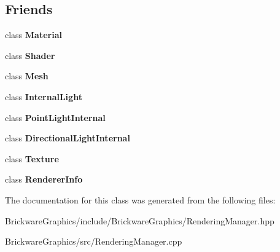 \subsection*{Friends}
\begin{DoxyCompactItemize}
\item 
\hypertarget{classBrickware_1_1Graphics_1_1RenderingManager_aa1212b6e372a0f45d2c01f3cd203af77}{}class {\bfseries Material}\label{classBrickware_1_1Graphics_1_1RenderingManager_aa1212b6e372a0f45d2c01f3cd203af77}

\item 
\hypertarget{classBrickware_1_1Graphics_1_1RenderingManager_a03c2d524ace9ade9c3f55b43c99bcea1}{}class {\bfseries Shader}\label{classBrickware_1_1Graphics_1_1RenderingManager_a03c2d524ace9ade9c3f55b43c99bcea1}

\item 
\hypertarget{classBrickware_1_1Graphics_1_1RenderingManager_aa41a130f156b145bffb3f4b5172c4c93}{}class {\bfseries Mesh}\label{classBrickware_1_1Graphics_1_1RenderingManager_aa41a130f156b145bffb3f4b5172c4c93}

\item 
\hypertarget{classBrickware_1_1Graphics_1_1RenderingManager_aea2864acc90890ef2bdd62187fac4a58}{}class {\bfseries Internal\+Light}\label{classBrickware_1_1Graphics_1_1RenderingManager_aea2864acc90890ef2bdd62187fac4a58}

\item 
\hypertarget{classBrickware_1_1Graphics_1_1RenderingManager_a63a6c2c4df25a9ee153e5cf241d1d24e}{}class {\bfseries Point\+Light\+Internal}\label{classBrickware_1_1Graphics_1_1RenderingManager_a63a6c2c4df25a9ee153e5cf241d1d24e}

\item 
\hypertarget{classBrickware_1_1Graphics_1_1RenderingManager_a0c1113485595ada9795ea92a3791a121}{}class {\bfseries Directional\+Light\+Internal}\label{classBrickware_1_1Graphics_1_1RenderingManager_a0c1113485595ada9795ea92a3791a121}

\item 
\hypertarget{classBrickware_1_1Graphics_1_1RenderingManager_af7f909106d08e36cd50aa58e36f9bf47}{}class {\bfseries Texture}\label{classBrickware_1_1Graphics_1_1RenderingManager_af7f909106d08e36cd50aa58e36f9bf47}

\item 
\hypertarget{classBrickware_1_1Graphics_1_1RenderingManager_abdde49e85312787ce3bf7bbdc2579236}{}class {\bfseries Renderer\+Info}\label{classBrickware_1_1Graphics_1_1RenderingManager_abdde49e85312787ce3bf7bbdc2579236}

\end{DoxyCompactItemize}


The documentation for this class was generated from the following files\+:\begin{DoxyCompactItemize}
\item 
Brickware\+Graphics/include/\+Brickware\+Graphics/Rendering\+Manager.\+hpp\item 
Brickware\+Graphics/src/Rendering\+Manager.\+cpp\end{DoxyCompactItemize}
